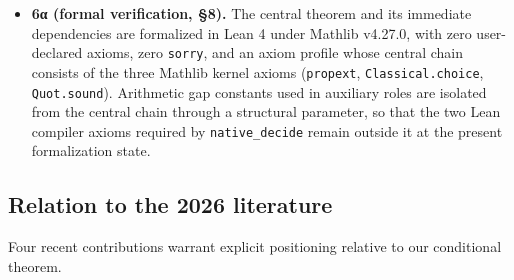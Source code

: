 \documentclass[
  11pt]{amsart}
\theoremstyle{plain}
\theoremstyle{definition}
\theoremstyle{remark}
\begin{document}
\begin{itemize}
  cycle length, structural-class eliminations (Steiner 1977 circuits;
  Knight 2026 high cycles), probabilistic density results (Terras 1976;
  Tao 2019/2022), and recent reformulation attempts (Santana 2026;
  Dhiman-Pandey 2026; Rozier-Terracol 2026). The typology makes
  explicit, to the best of our literature review, that no published
  result supplies the deterministic upper bound on cycle length that our
  third hypothesis encodes.
\item
  \textbf{6α (formal verification, §8).} The central theorem and its
  immediate dependencies are formalized in Lean 4 under Mathlib v4.27.0,
  with zero user-declared axioms, zero \texttt{sorry}, and an axiom
  profile whose central chain consists of the three Mathlib kernel
  axioms (\texttt{propext}, \texttt{Classical.choice},
  \texttt{Quot.sound}). Arithmetic gap constants used in auxiliary roles
  are isolated from the central chain through a structural parameter, so
  that the two Lean compiler axioms required by \texttt{native\_decide}
  remain outside it at the present formalization state.
\end{itemize}

\subsection{Relation to the 2026
literature}\label{relation-to-the-2026-literature}

Four recent contributions warrant explicit positioning relative to our
conditional theorem.
\end{document}
